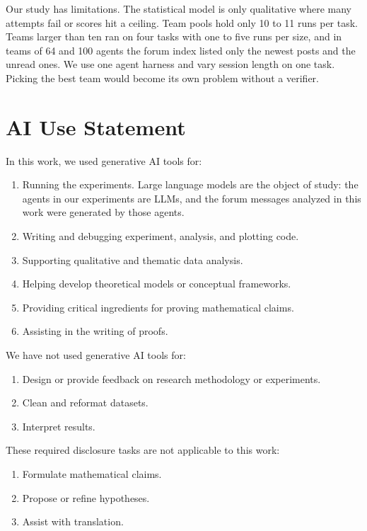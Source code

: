 \documentclass[numbers,10pt]{arxiv}
\begin{document}
Our study has limitations. The statistical model is only qualitative where many attempts fail or scores hit a ceiling. Team pools hold only 10 to 11 runs per task. Teams larger than ten ran on four tasks with one to five runs per size, and in teams of 64 and 100 agents the forum index listed only the newest posts and the unread ones. We use one agent harness and vary session length on one task. Picking the best team would become its own problem without a verifier.

\FloatBarrier
\section*{AI Use Statement}

In this work, we used generative AI tools for:
\begin{enumerate}
    \item Running the experiments. Large language models are the object of study: the agents in our experiments are LLMs, and the forum messages analyzed in this work were generated by those agents.
    \item Writing and debugging experiment, analysis, and plotting code.
    \item Supporting qualitative and thematic data analysis.
    \item Helping develop theoretical models or conceptual frameworks.
    \item Providing critical ingredients for proving mathematical claims.
    \item Assisting in the writing of proofs.
\end{enumerate}

We have not used generative AI tools for:
\begin{enumerate}
    \item Design or provide feedback on research methodology or experiments.
    \item Clean and reformat datasets.
    \item Interpret results.
\end{enumerate}

These required disclosure tasks are not applicable to this work:
\begin{enumerate}
    \item Formulate mathematical claims.
    \item Propose or refine hypotheses.
    \item Assist with translation.
\end{enumerate}
\end{document}
